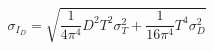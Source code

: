 


\[
  \sigma_{I_{D}} = \sqrt{\frac{1}{4\pi^{4}} D^{2} T^{2} \sigma_{T}^{2} + \frac{1}{16 \pi^{4}} T^{4} \sigma_{D}^{2}}
\]

